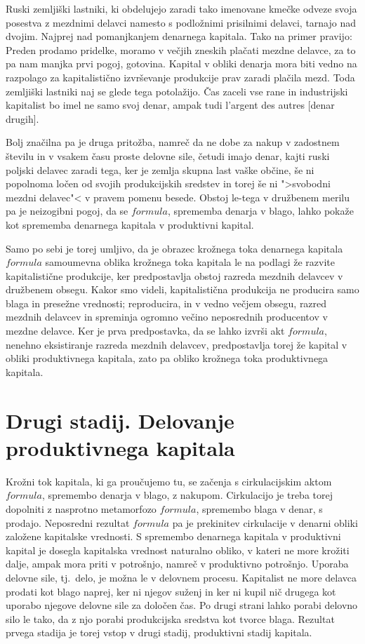\documentclass[a5paper]{scrbook}
\begin{document}
Ruski zemljiški lastniki, ki obdelujejo zaradi tako imenovane kmečke odveze svoja posestva z mezdnimi delavci namesto s podložnimi prisilnimi delavci, tarnajo nad dvojim. Najprej nad pomanjkanjem denarnega kapitala. Tako na primer pravijo: Preden prodamo pridelke, moramo v večjih zneskih plačati mezdne delavce, za to pa nam manjka prvi pogoj, gotovina. Kapital v obliki denarja mora biti vedno na razpolago za kapitalistično izvrševanje produkcije prav zaradi plačila mezd. Toda zemljiški lastniki naj se glede tega potolažijo. Čas zaceli vse rane in industrijski kapitalist bo imel ne samo svoj denar, ampak tudi l'argent des autres [denar drugih].

Bolj značilna pa je druga pritožba, namreč da ne dobe za nakup v zadostnem številu in v vsakem času proste delovne sile, četudi imajo denar, kajti ruski poljski delavec zaradi tega, ker je zemlja skupna last vaške občine, še ni popolnoma ločen od svojih produkcijskih sredstev in torej še ni ">svobodni mezdni delavec"< v pravem pomenu besede. Obstoj le-tega v družbenem merilu pa je neizogibni pogoj, da se \( formula \), sprememba denarja v blago, lahko pokaže kot sprememba denarnega kapitala v produktivni kapital.

Samo po sebi je torej umljivo, da je obrazec krožnega toka denarnega kapitala \( formula \) samoumevna oblika krožnega toka kapitala le na podlagi že razvite kapitalistične produkcije, ker predpostavlja obstoj razreda mezdnih delavcev v družbenem obsegu. Kakor smo videli, kapitalistična produkcija ne producira samo blaga in presežne vrednosti; reproducira, in v vedno večjem obsegu, razred mezdnih delavcev in spreminja ogromno večino neposrednih producentov v mezdne delavce. Ker je prva predpostavka, da se lahko izvrši akt \( formula \), nenehno eksistiranje razreda mezdnih delavcev, predpostavlja torej že kapital v obliki produktivnega kapitala, zato pa obliko krožnega toka produktivnega kapitala.

\section{Drugi stadij. Delovanje produktivnega kapitala}

Krožni tok kapitala, ki ga proučujemo tu, se začenja s cirkulacijskim aktom \( formula \), spremembo denarja v blago, z nakupom. Cirkulacijo je treba torej dopolniti z nasprotno metamorfozo \( formula \), spremembo blaga v denar, s prodajo. Neposredni rezultat \( formula \) pa je prekinitev cirkulacije v denarni obliki založene kapitalske vrednosti. S spremembo denarnega kapitala v produktivni kapital je dosegla kapitalska vrednost naturalno obliko, v kateri ne more krožiti dalje, ampak mora priti v potrošnjo, namreč v produktivno potrošnjo. Uporaba delovne sile, tj.\ delo, je možna le v delovnem procesu. Kapitalist ne more delavca prodati kot blago naprej, ker ni njegov suženj in ker ni kupil nič drugega kot uporabo njegove delovne sile za določen čas. Po drugi strani lahko porabi delovno silo le tako, da z njo porabi produkcijska sredstva kot tvorce blaga. Rezultat prvega stadija je torej vstop v drugi stadij, produktivni stadij kapitala.
\end{document}
